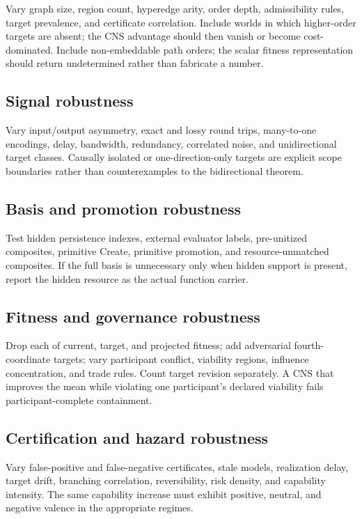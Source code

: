 \documentclass[11pt]{article}
\begin{document}
Vary graph size, region count, hyperedge arity, order depth, admissibility rules, target prevalence, and certificate correlation. Include worlds in which higher-order targets are absent; the CNS advantage should then vanish or become cost-dominated. Include non-embeddable path orders; the scalar fitness representation should return undetermined rather than fabricate a number.

\subsection{Signal robustness}

Vary input/output asymmetry, exact and lossy round trips, many-to-one encodings, delay, bandwidth, redundancy, correlated noise, and unidirectional target classes. Causally isolated or one-direction-only targets are explicit scope boundaries rather than counterexamples to the bidirectional theorem.

\subsection{Basis and promotion robustness}

Test hidden persistence indexes, external evaluator labels, pre-unitized composites, primitive Create, primitive promotion, and resource-unmatched composites. If the full basis is unnecessary only when hidden support is present, report the hidden resource as the actual function carrier.

\subsection{Fitness and governance robustness}

Drop each of current, target, and projected fitness; add adversarial fourth-coordinate targets; vary participant conflict, viability regions, influence concentration, and trade rules. Count target revision separately. A CNS that improves the mean while violating one participant's declared viability fails participant-complete containment.

\subsection{Certification and hazard robustness}

Vary false-positive and false-negative certificates, stale models, realization delay, target drift, branching correlation, reversibility, risk density, and capability intensity. The same capability increase must exhibit positive, neutral, and negative valence in the appropriate regimes.
\end{document}
